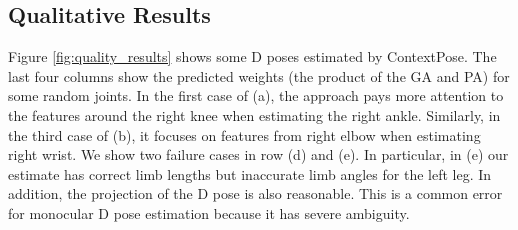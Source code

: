 \subsection{Qualitative Results}
Figure \ref{fig:quality_results} shows some D poses estimated by ContextPose. The last four columns show the predicted weights (\ie the product of the GA and PA) for some random joints. In the first case of (a), the approach pays more attention to the features around the right knee when estimating the right ankle. Similarly, in the third case of (b), it focuses on features from right elbow when estimating right wrist. We show two failure cases in row (d) and (e). In particular, in (e) our estimate has correct limb lengths but inaccurate limb angles for the left leg. In addition, the projection of the D pose is also reasonable. This is a common error for monocular D pose estimation because it has severe ambiguity.
